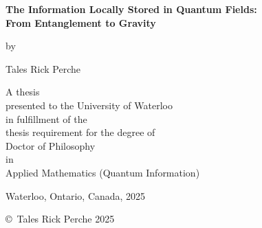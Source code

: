 \documentclass[letterpaper,12pt,titlepage,oneside,final]{book}
\begin{document}
\pagestyle{empty}

\begin{titlepage}
        \begin{center}
        \vspace*{1.0cm}

        \Huge
        {\bf The Information Locally Stored in Quantum Fields:\\ From Entanglement to Gravity}

        \vspace*{1.0cm}

        \normalsize
        by \\

        \vspace*{1.0cm}

        \Large
        Tales Rick Perche \\

        \vspace*{3.0cm}

        \normalsize
        A thesis\\ presented to the
        University of Waterloo \\ 
        in fulfillment of the \\
        thesis requirement for the degree of \\
        Doctor of Philosophy \\
        in \\
       Applied Mathematics (Quantum Information) \\

        \vspace*{2.0cm}

        Waterloo, Ontario, Canada, 2025 \\

        \vspace*{1.0cm}

        \copyright\ Tales Rick Perche 2025 \\
        \end{center}
\end{titlepage}

\pagestyle{plain}
\setcounter{page}{2}
\end{document}
